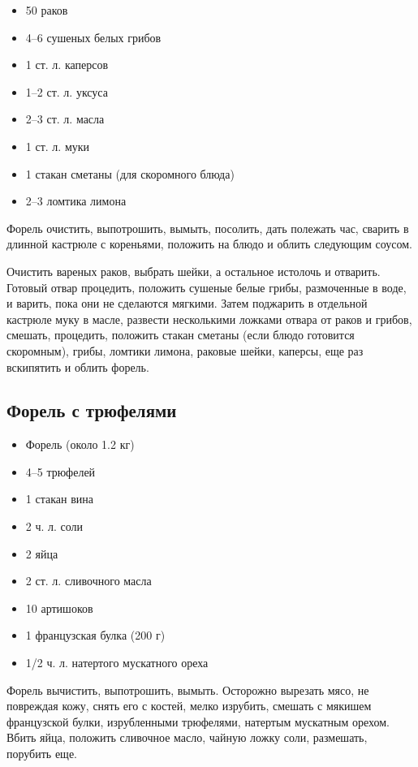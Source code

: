 \begin{itemize}
	\item 50 раков
    \item 4–6 сушеных белых грибов 
    \item 1 ст. л. каперсов 
    \item 1–2 ст. л. уксуса
    \item 2–3 ст. л. масла
    \item 1 ст. л. муки
    \item 1 стакан сметаны (для скоромного блюда) 
    \item 2–3 ломтика лимона
\end{itemize}

Форель очистить, выпотрошить, вымыть, посолить, дать полежать час, сварить в длинной кастрюле с кореньями, положить на блюдо и облить следующим соусом.

Очистить вареных раков, выбрать шейки, а остальное истолочь и отварить. Готовый отвар процедить, положить сушеные белые грибы, размоченные в воде, и варить, пока они не сделаются мягкими. Затем поджарить в отдельной кастрюле муку в масле, развести несколькими ложками отвара от раков и грибов, смешать, процедить, положить стакан сметаны (если блюдо готовится скоромным), грибы, ломтики лимона, раковые шейки, каперсы, еще раз вскипятить и облить форель.

\subsection{Форель с трюфелями}

\begin{itemize}
	\item Форель (около 1.2 кг)
    \item 4–5 трюфелей
    \item 1 стакан вина
    \item 2 ч. л. соли 
    \item 2 яйца 
    \item 2 ст. л. сливочного масла
    \item 10 артишоков
    \item 1 французская булка (200 г)
    \item 1/2 ч. л. натертого мускатного ореха
\end{itemize}

Форель вычистить, выпотрошить, вымыть. Осторожно вырезать мясо, не повреждая кожу, снять его с костей, мелко изрубить, смешать с мякишем французской булки, изрубленными трюфелями, натертым мускатным орехом. Вбить яйца, положить сливочное масло, чайную ложку соли, размешать, порубить еще.

